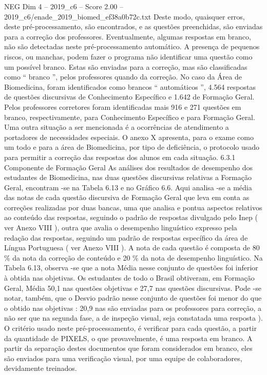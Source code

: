 \begin{textsample}{NEG Dim 4 – 2019\_c6 – Score 2.00 – 2019\_c6/enade\_2019\_biomed\_ef38a0b72c.txt}
Deste modo, quaisquer erros, deste pré-processamento, são encontrados, e as questões preenchidas, são enviadas para a correção dos professores.
Eventualmente, algumas respostas em branco, não são detectadas neste pré-processamento automático.
A presença de pequenos riscos, ou manchas, podem fazer o programa não identificar uma questão como um possível branco.
Estas são enviadas para a correção, mas são classificadas como “ branco ”, pelos professores quando da correção.
No caso da Área de Biomedicina, foram identificados como brancos “ automáticos ”, 4.564 respostas de questões discursivas de Conhecimento Específico e 1.642 de Formação Geral.
Pelos professores corretores foram identificadas mais 916 e 271 questões em branco, respectivamente, para Conhecimento Específico e para Formação Geral.
Uma outra situação a ser mencionada é a ocorrências de atendimento a portadores de necessidades especiais.
O anexo X apresenta, para o exame como um todo e para a área de Biomedicina, por tipo de deficiência, o protocolo usado para permitir a correção das respostas dos alunos em cada situação. 6.3.1 Componente de Formação Geral As análises dos resultados de desempenho dos estudantes de Biomedicina, nas duas questões discursivas relativas a Formação Geral, encontram -se na Tabela 6.13 e no Gráfico 6.6.
Aqui analisa -se a média das notas de cada questão discursiva de Formação Geral que leva em conta as correções realizadas por duas bancas, uma que analisa e pontua aspectos relativos ao conteúdo das respostas, seguindo o padrão de respostas divulgado pelo Inep ( ver Anexo VIII ), outra que avalia o desempenho linguístico expresso pela redação das respostas, seguindo um padrão de respostas específico da área de Língua Portuguesa ( ver Anexo VIII ).
A nota de cada questão é composta de 80 \% da nota da correção de conteúdo e 20 \% da nota de desempenho linguístico.
Na Tabela 6.13, observa -se que a nota Média nesse conjunto de questões foi inferior à obtida nas objetivas.
Os estudantes de todo o Brasil obtiveram, em Formação Geral, Média 50,1 nas questões objetivas e 27,7 nas questões discursivas.
Pode -se notar, também, que o Desvio padrão nesse conjunto de questões foi menor do que o obtido nas objetivas : 20,9 nas são enviadas para os professores para correção, a não ser que na segunda fase, a de inspeção visual, seja constatada uma resposta ).
O critério usado neste pré-processamento, é verificar para cada questão, a partir da quantidade de PIXELS, o que provavelmente, é uma resposta em branco.
A partir da separação destes documentos que foram considerados em branco, eles são enviados para uma verificação visual, por uma equipe de colaboradores, devidamente treinados.

\end{textsample}
